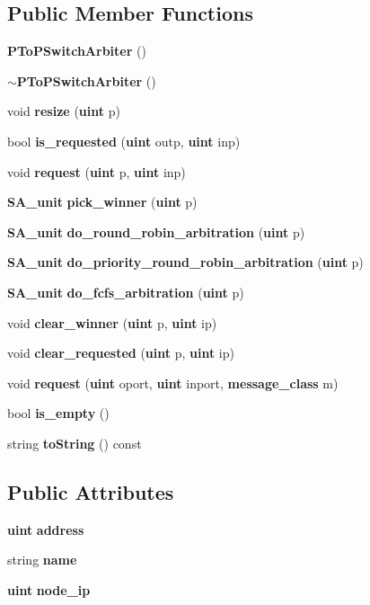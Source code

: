 \subsection*{Public Member Functions}
\begin{CompactItemize}
\item 
{\bf PToPSwitchArbiter} ()
\item 
{\bf $\sim$PToPSwitchArbiter} ()
\item 
void {\bf resize} ({\bf uint} p)
\item 
bool {\bf is\_\-requested} ({\bf uint} outp, {\bf uint} inp)
\item 
void {\bf request} ({\bf uint} p, {\bf uint} inp)
\item 
{\bf SA\_\-unit} {\bf pick\_\-winner} ({\bf uint} p)
\item 
{\bf SA\_\-unit} {\bf do\_\-round\_\-robin\_\-arbitration} ({\bf uint} p)
\item 
{\bf SA\_\-unit} {\bf do\_\-priority\_\-round\_\-robin\_\-arbitration} ({\bf uint} p)
\item 
{\bf SA\_\-unit} {\bf do\_\-fcfs\_\-arbitration} ({\bf uint} p)
\item 
void {\bf clear\_\-winner} ({\bf uint} p, {\bf uint} ip)
\item 
void {\bf clear\_\-requested} ({\bf uint} p, {\bf uint} ip)
\item 
void {\bf request} ({\bf uint} oport, {\bf uint} inport, {\bf message\_\-class} m)
\item 
bool {\bf is\_\-empty} ()
\item 
string {\bf toString} () const 
\end{CompactItemize}
\subsection*{Public Attributes}
\begin{CompactItemize}
\item 
{\bf uint} {\bf address}
\item 
string {\bf name}
\item 
{\bf uint} {\bf node\_\-ip}
\end{CompactItemize}
